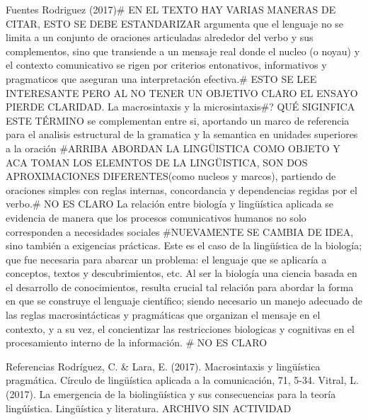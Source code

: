 \documentclass[12pt]{article}
\begin{document}
Fuentes Rodriguez (2017)# EN EL TEXTO HAY VARIAS MANERAS DE CITAR, ESTO SE DEBE ESTANDARIZAR argumenta que el lenguaje no se limita a un conjunto de oraciones articuladas alrededor del verbo y sus complementos, sino que transiende a un mensaje real donde el nucleo (o noyau) y el contexto comunicativo se rigen por criterios entonativos, informativos y pragmaticos que aseguran una interpretación efectiva.# ESTO SE LEE INTERESANTE PERO AL NO TENER UN OBJETIVO CLARO EL ENSAYO PIERDE CLARIDAD. La macrosintaxis y la microsintaxis#? QUÉ SIGINFICA ESTE TÉRMINO se complementan entre si, aportando un marco de referencia para el analisis estructural de la gramatica y la semantica en unidades superiores a la oración #ARRIBA ABORDAN LA LINGÜISTICA COMO OBJETO Y ACA TOMAN LOS ELEMNTOS DE LA LINGÜISTICA, SON DOS APROXIMACIONES DIFERENTES(como nucleos y marcos), partiendo de oraciones simples con reglas internas, concordancia y dependencias regidas por el verbo.# NO ES CLARO
La relación entre biología y lingüística aplicada se evidencia de manera que los procesos comunicativos humanos no solo corresponden a necesidades sociales #NUEVAMENTE SE CAMBIA DE IDEA, sino también a exigencias prácticas. Este es el caso de la lingüística de la biología; que fue necesaria para abarcar un problema: el lenguaje que se aplicaría a conceptos, textos y descubrimientos, etc.    
Al ser la biología una ciencia basada en el desarrollo de conocimientos, resulta crucial tal relación para abordar la forma en que se construye el lenguaje científico; siendo necesario un  manejo adecuado de las reglas macrosintácticas y pragmáticas que organizan el mensaje en el contexto, y a su vez, el concientizar las restricciones biologicas y cognitivas en el procesamiento interno de la información.  # NO ES CLARO

Referencias
Rodríguez, C. & Lara, E. (2017). Macrosintaxis y lingüística pragmática. Círculo de lingüística aplicada a la comunicación, 71, 5-34.
Vitral, L.(2017). La emergencia de la biolingüística y sus consecuencias para la teoría lingúística. Lingüística y literatura.
ARCHIVO SIN ACTIVIDAD
\end{document}
